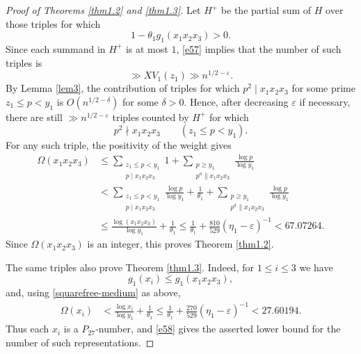 \documentclass[12pt,a4paper,reqno]{amsart}
\numberwithin{equation}{section}
\theoremstyle{plain}
\theoremstyle{definition}
\begin{document}
\begin{proof}[Proof of Theorems \ref{thm1.2} and \ref{thm1.3}]
Let $H^+$ be the partial sum of $H$ over those triples for which
\[
1-\theta_1g_1(x_1x_2x_3)>0.
\]
Since each summand in $H^+$ is at most $1$, \eqref{e57} implies that the number of such triples is
\begin{equation}\label{e58}
\gg XV_1(z_1)\gg n^{1/2-\varepsilon}.
\end{equation}
By Lemma \ref{lem3}, the contribution of triples for which $p^2\mid x_1x_2x_3$ for some prime $z_1\leq p<y_1$ is $O(n^{1/2-\delta})$ for some $\delta>0$. Hence, after decreasing $\varepsilon$ if necessary, there are still $\gg n^{1/2-\varepsilon}$ triples counted by $H^+$ for which
\begin{equation}\label{squarefree-medium}
p^2\nmid x_1x_2x_3\qquad(z_1\leq p<y_1).
\end{equation}
For any such triple, the positivity of the weight gives
\begin{align*}
\Omega(x_1x_2x_3)
&\leq
\sum_{\substack{z_1\leq p<y_1\\ p\mid x_1x_2x_3}}1
+
\sum_{\substack{p\geq y_1\\ p^a\parallel x_1x_2x_3}}\frac{\log p}{\log y_1} \\
&<
\sum_{\substack{z_1\leq p<y_1\\ p\mid x_1x_2x_3}}
\frac{\log p}{\log y_1}
+\frac1{\theta_1}
+
\sum_{\substack{p\geq y_1\\ p^a\parallel x_1x_2x_3}}
\frac{\log p}{\log y_1} \\
&\leq
\frac{\log(x_1x_2x_3)}{\log y_1}+\frac1{\theta_1}
\leq
\frac1{\theta_1}+\frac{810}{529}(\eta_1-\varepsilon)^{-1}
<67.07264.
\end{align*}
Since $\Omega(x_1x_2x_3)$ is an integer, this proves Theorem \ref{thm1.2}.

The same triples also prove Theorem \ref{thm1.3}. Indeed, for $1\leq i\leq3$ we have
\[
g_1(x_i)\leq g_1(x_1x_2x_3),
\]
and, using \eqref{squarefree-medium} as above,
\begin{align*}
\Omega(x_i)
&<
\frac{\log x_i}{\log y_1}+\frac1{\theta_1}
\leq
\frac1{\theta_1}+\frac{270}{529}(\eta_1-\varepsilon)^{-1}
<27.60194.
\end{align*}
Thus each $x_i$ is a $P_{27}$-number, and \eqref{e58} gives the asserted lower bound for the number of such representations.
\end{proof}
\end{document}
